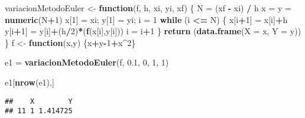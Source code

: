 \documentclass[]{article}
\newenvironment{Shaded}{\begin{snugshade}}{\end{snugshade}}
\newcommand{\KeywordTok}[1]{\textcolor[rgb]{0.13,0.29,0.53}{\textbf{#1}}}
\newcommand{\DataTypeTok}[1]{\textcolor[rgb]{0.13,0.29,0.53}{#1}}
\newcommand{\DecValTok}[1]{\textcolor[rgb]{0.00,0.00,0.81}{#1}}
\newcommand{\FloatTok}[1]{\textcolor[rgb]{0.00,0.00,0.81}{#1}}
\newcommand{\StringTok}[1]{\textcolor[rgb]{0.31,0.60,0.02}{#1}}
\newcommand{\ControlFlowTok}[1]{\textcolor[rgb]{0.13,0.29,0.53}{\textbf{#1}}}
\newcommand{\OperatorTok}[1]{\textcolor[rgb]{0.81,0.36,0.00}{\textbf{#1}}}
\newcommand{\NormalTok}[1]{#1}
\begin{document}
\begin{Shaded}
\begin{Highlighting}[]
\NormalTok{variacionMetodoEuler <-}\StringTok{ }\ControlFlowTok{function}\NormalTok{(f, h, xi, yi, xf)}
\NormalTok{\{}
\NormalTok{  N =}\StringTok{ }\NormalTok{(xf }\OperatorTok{-}\StringTok{ }\NormalTok{xi) }\OperatorTok{/}\StringTok{ }\NormalTok{h}
\NormalTok{  x =}\StringTok{ }\NormalTok{y =}\StringTok{ }\KeywordTok{numeric}\NormalTok{(N}\OperatorTok{+}\DecValTok{1}\NormalTok{)}
\NormalTok{  x[}\DecValTok{1}\NormalTok{] =}\StringTok{ }\NormalTok{xi; }
\NormalTok{  y[}\DecValTok{1}\NormalTok{] =}\StringTok{ }\NormalTok{yi;}
\NormalTok{  i =}\StringTok{ }\DecValTok{1}
  \ControlFlowTok{while}\NormalTok{ (i }\OperatorTok{<=}\StringTok{ }\NormalTok{N)}
\NormalTok{  \{}
\NormalTok{    x[i}\OperatorTok{+}\DecValTok{1}\NormalTok{] =}\StringTok{ }\NormalTok{x[i]}\OperatorTok{+}\NormalTok{h}
\NormalTok{    y[i}\OperatorTok{+}\DecValTok{1}\NormalTok{] =}\StringTok{ }\NormalTok{y[i]}\OperatorTok{+}\NormalTok{(h}\OperatorTok{/}\DecValTok{2}\NormalTok{)}\OperatorTok{*}\NormalTok{(}\KeywordTok{f}\NormalTok{(x[i],y[i]))}
\NormalTok{    i =}\StringTok{ }\NormalTok{i}\OperatorTok{+}\DecValTok{1}
\NormalTok{  \}}
  \KeywordTok{return}\NormalTok{ (}\KeywordTok{data.frame}\NormalTok{(}\DataTypeTok{X =}\NormalTok{ x, }\DataTypeTok{Y =}\NormalTok{ y))}
\NormalTok{\}}
\NormalTok{f <-}\StringTok{ }\ControlFlowTok{function}\NormalTok{(x,y) \{x}\OperatorTok{+}\NormalTok{y}\OperatorTok{-}\DecValTok{1}\OperatorTok{+}\NormalTok{x}\OperatorTok{^}\DecValTok{2}\NormalTok{\}}

\NormalTok{e1 =}\StringTok{ }\KeywordTok{variacionMetodoEuler}\NormalTok{(f, }\FloatTok{0.1}\NormalTok{, }\DecValTok{0}\NormalTok{, }\DecValTok{1}\NormalTok{, }\DecValTok{1}\NormalTok{)}

\NormalTok{e1[}\KeywordTok{nrow}\NormalTok{(e1),]}
\end{Highlighting}
\end{Shaded}

\begin{verbatim}
##    X        Y
## 11 1 1.414725
\end{verbatim}
\end{document}
